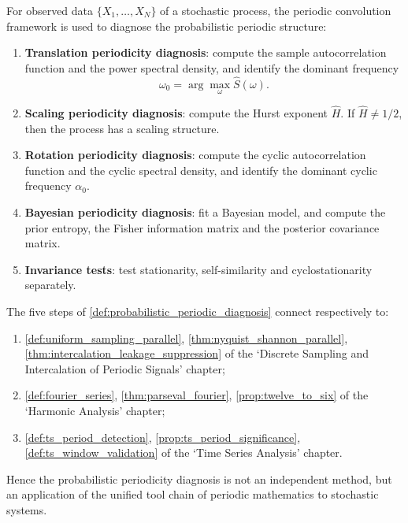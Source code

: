 \begin{definition}\label{def:probabilistic_periodic_diagnosis}
For observed data $\{X_1,\dots,X_N\}$ of a stochastic process, the periodic convolution framework is used to diagnose the probabilistic periodic structure:
\begin{enumerate}[label=(\roman*)]
    \item \textbf{Translation periodicity diagnosis}: compute the sample autocorrelation function and the power spectral density, and identify the dominant frequency
    \[
    \omega_0=\arg\max_\omega \hat S(\omega).
    \]
    \item \textbf{Scaling periodicity diagnosis}: compute the Hurst exponent $\hat H$. If $\hat H\neq1/2$, then the process has a scaling structure.
    \item \textbf{Rotation periodicity diagnosis}: compute the cyclic autocorrelation function and the cyclic spectral density, and identify the dominant cyclic frequency $\alpha_0$.
    \item \textbf{Bayesian periodicity diagnosis}: fit a Bayesian model, and compute the prior entropy, the Fisher information matrix and the posterior covariance matrix.
    \item \textbf{Invariance tests}: test stationarity, self-similarity and cyclostationarity separately.
\end{enumerate}
\end{definition}

\begin{theorem}\label{thm:prob_diagnosis_integration}
The five steps of \cref{def:probabilistic_periodic_diagnosis} connect respectively to:
\begin{enumerate}[label=(\roman*)]
    \item \cref{def:uniform_sampling_parallel}, \cref{thm:nyquist_shannon_parallel}, \cref{thm:intercalation_leakage_suppression} of the `Discrete Sampling and Intercalation of Periodic Signals' chapter;
    \item \cref{def:fourier_series}, \cref{thm:parseval_fourier}, \cref{prop:twelve_to_six} of the `Harmonic Analysis' chapter;
    \item \cref{def:ts_period_detection}, \cref{prop:ts_period_significance}, \cref{def:ts_window_validation} of the `Time Series Analysis' chapter.
\end{enumerate}
Hence the probabilistic periodicity diagnosis is not an independent method, but an application of the unified tool chain of periodic mathematics to stochastic systems.
\end{theorem}

